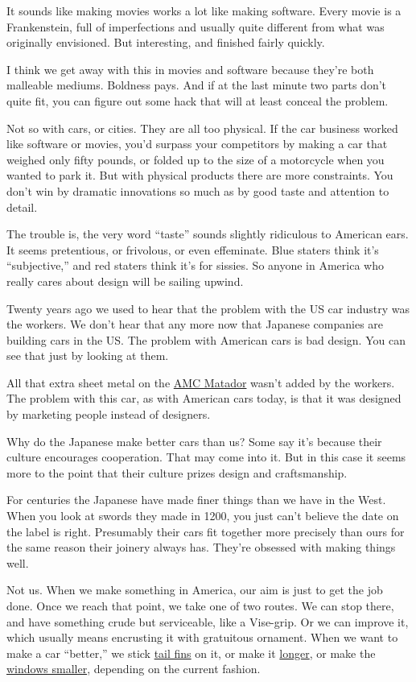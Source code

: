 It sounds like making movies works a lot like making software. Every
movie is a Frankenstein, full of imperfections and usually quite
different from what was originally envisioned. But interesting, and
finished fairly quickly.

I think we get away with this in movies and software because they're
both malleable mediums. Boldness pays. And if at the last minute two
parts don't quite fit, you can figure out some hack that will at least
conceal the problem.

Not so with cars, or cities. They are all too physical. If the car
business worked like software or movies, you'd surpass your competitors
by making a car that weighed only fifty pounds, or folded up to the size
of a motorcycle when you wanted to park it. But with physical products
there are more constraints. You don't win by dramatic innovations so
much as by good taste and attention to detail.

The trouble is, the very word ``taste'' sounds slightly ridiculous to
American ears. It seems pretentious, or frivolous, or even effeminate.
Blue staters think it's ``subjective,'' and red staters think it's for
sissies. So anyone in America who really cares about design will be
sailing upwind.

Twenty years ago we used to hear that the problem with the US car
industry was the workers. We don't hear that any more now that Japanese
companies are building cars in the US. The problem with American cars is
bad design. You can see that just by looking at them.

All that extra sheet metal on the \href{matador.html}{AMC Matador}
wasn't added by the workers. The problem with this car, as with American
cars today, is that it was designed by marketing people instead of
designers.

Why do the Japanese make better cars than us? Some say it's because
their culture encourages cooperation. That may come into it. But in this
case it seems more to the point that their culture prizes design and
craftsmanship.

For centuries the Japanese have made finer things than we have in the
West. When you look at swords they made in 1200, you just can't believe
the date on the label is right. Presumably their cars fit together more
precisely than ours for the same reason their joinery always has.
They're obsessed with making things well.

Not us. When we make something in America, our aim is just to get the
job done. Once we reach that point, we take one of two routes. We can
stop there, and have something crude but serviceable, like a Vise-grip.
Or we can improve it, which usually means encrusting it with gratuitous
ornament. When we want to make a car ``better,'' we stick
\href{59eldorado.html}{tail fins} on it, or make it
\href{75eldorado.html}{longer}, or make the \href{04magnum.html}{windows
smaller}, depending on the current fashion.


